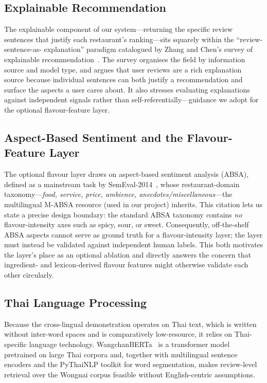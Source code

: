 \documentclass[10pt,twocolumn]{article}
\begin{document}
\subsection{Explainable Recommendation}
The explainable component of our system---returning the specific review sentences that
justify each restaurant's ranking---sits squarely within the ``review-sentence-as-
explanation'' paradigm catalogued by Zhang and Chen's survey of explainable
recommendation~\cite{zhang2020explainable}. The survey organises the field by
information source and model type, and argues that user reviews are a rich explanation
source because individual sentences can both justify a recommendation and surface the
aspects a user cares about. It also stresses evaluating explanations against independent
signals rather than self-referentially---guidance we adopt for the optional
flavour-feature layer.

\subsection{Aspect-Based Sentiment and the Flavour-Feature Layer}
The optional flavour layer draws on aspect-based sentiment analysis (ABSA), defined as a
mainstream task by SemEval-2014~\cite{pontiki2014semeval}, whose restaurant-domain
taxonomy---\emph{food, service, price, ambience, anecdotes/miscellaneous}---the
multilingual M-ABSA resource (used in our project) inherits. This citation lets us state
a precise design boundary: the standard ABSA taxonomy contains \emph{no}
flavour-intensity axes such as spicy, sour, or sweet. Consequently, off-the-shelf ABSA
aspects cannot serve as ground truth for a flavour-intensity layer; the layer must
instead be validated against independent human labels. This both motivates the layer's
place as an optional ablation and directly answers the concern that ingredient- and
lexicon-derived flavour features might otherwise validate each other circularly.

\subsection{Thai Language Processing}
Because the cross-lingual demonstration operates on Thai text, which is written without
inter-word spaces and is comparatively low-resource, it relies on Thai-specific
language technology. WangchanBERTa~\cite{lowphansirikul2021wangchanberta} is a
transformer model pretrained on large Thai corpora and, together with multilingual
sentence encoders and the PyThaiNLP toolkit for word segmentation, makes review-level
retrieval over the Wongnai corpus feasible without English-centric assumptions.
\end{document}
